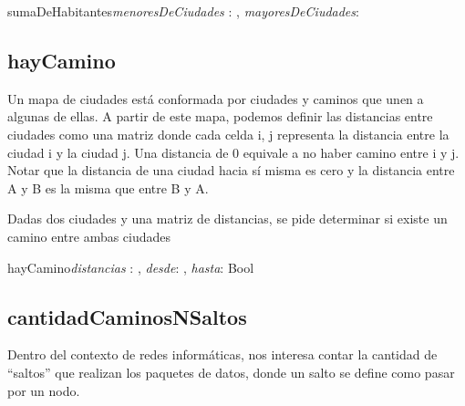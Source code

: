 \documentclass[10pt,a4paper]{article}
\begin{document}
\vspace{2mm}

\begin{proc}{sumaDeHabitantes}{\In \textit{menoresDeCiudades} : , \In \textit{mayoresDeCiudades}: }{}
\end{proc}

\vspace{4mm}

\subsection{hayCamino}

 Un mapa de ciudades está conformada por ciudades y caminos que unen a algunas de ellas. A partir de este mapa, podemos definir las distancias entre ciudades como una matriz donde cada celda i, j representa la distancia entre la ciudad i y la ciudad j. Una distancia de 0 equivale a no haber camino entre i y j. Notar que la distancia de una ciudad hacia sí misma es cero y la distancia entre A y B es la misma que entre B y A.
 
 Dadas dos ciudades y una matriz de distancias, se pide determinar si existe un camino entre ambas ciudades
 
 \vspace{2mm}
 
 \begin{proc}{hayCamino}{\In \textit{distancias} : \TLista{\TLista{\ent}}, \In \textit{desde}: \ent, \In \textit{hasta}: \ent}{Bool}
	\requiere{}
\end{proc}

\vspace{4mm}

\subsection{cantidadCaminosNSaltos}

 Dentro del contexto de redes informáticas, nos interesa contar la cantidad de “saltos” que realizan los paquetes de datos, donde un salto se define como pasar por un nodo.
\end{document}

